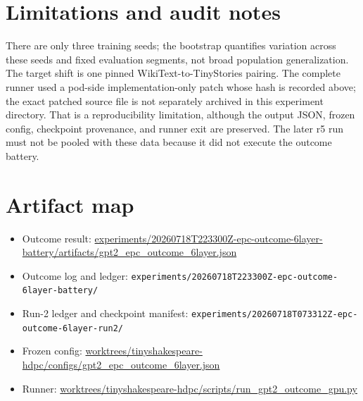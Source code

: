 \documentclass[11pt]{article}
\begin{document}
\section{Limitations and audit notes}
There are only three training seeds; the bootstrap quantifies variation across these seeds and fixed evaluation segments, not broad population generalization. The target shift is one pinned WikiText-to-TinyStories pairing. The complete runner used a pod-side implementation-only patch whose hash is recorded above; the exact patched source file is not separately archived in this experiment directory. That is a reproducibility limitation, although the output JSON, frozen config, checkpoint provenance, and runner exit are preserved. The later r5 run must not be pooled with these data because it did not execute the outcome battery.

\section{Artifact map}
\begin{itemize}
\item Outcome result: \url{experiments/20260718T223300Z-epc-outcome-6layer-battery/artifacts/gpt2_epc_outcome_6layer.json}
\item Outcome log and ledger: \texttt{experiments/20260718T223300Z-epc-outcome-6layer-battery/}
\item Run-2 ledger and checkpoint manifest: \texttt{experiments/20260718T073312Z-epc-outcome-6layer-run2/}
\item Frozen config: \url{worktrees/tinyshakespeare-hdpc/configs/gpt2_epc_outcome_6layer.json}
\item Runner: \url{worktrees/tinyshakespeare-hdpc/scripts/run_gpt2_outcome_gpu.py}
\end{itemize}
\end{document}
